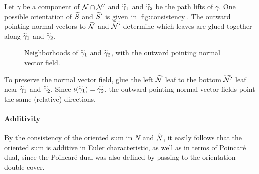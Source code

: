   Let $\gamma$ be a component of $\mathcal{N}\cap \mathcal{N}'$ and $\widetilde{\gamma}_1$ and $\widetilde{\gamma}_2$ be the path lifts of $\gamma$.
  One possible orientation of $\widetilde{S}$ and $\widetilde{S}'$ is given in  \autoref{fig:consistency}.  The outward pointing normal vectors to $\widetilde{\mathcal{N}}$ and $\widetilde{\mathcal{N}'}$ determine which leaves are glued together along $\widetilde{\gamma}_1$ and $\widetilde{\gamma}_2$.

\begin{figure}
  \centering
  \caption{Neighborhoods of $\widetilde{\gamma}_1$ and $\widetilde{\gamma}_2$, with the outward pointing normal vector field.}
  \label{fig:consistency}
\end{figure}

To preserve the normal vector field, glue the left $\widetilde{\mathcal{N}}$ leaf to the bottom $\widetilde{\mathcal{N}'}$ leaf near $\widetilde{\gamma}_1$ and $\widetilde{\gamma}_2$.
Since $\iota(\widetilde{\gamma}_1)=\widetilde{\gamma_2}$, the outward pointing normal vector fields point the same (relative) directions.


\paragraph{Additivity}

By the consistency of the oriented sum in $N$ and $\widetilde{N}$, it easily follows that the oriented sum is additive in Euler characteristic, as well as in terms of Poincar\'e dual, since the Poincar\'e dual was also defined by passing to the orientation double cover.

